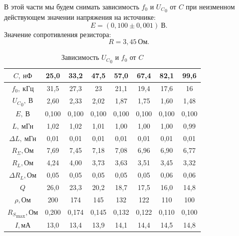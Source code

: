 \documentclass[12pt,a4paper]{article}
\begin{document}
В этой части мы будем снимать зависимость $f_0$ и ${U_C}_0$ от $C$ при неизменном действующем значении напряжения на источнике:
\begin{equation} 
E = (0,100\pm0,001)~\text{В}.
\end{equation}
Значение сопротивления резистора:
\begin{equation}
R = 3,45~\text{Ом}.
\end{equation}
\begin{table}[ht]\centering
\begin{tabular}{|*{8}{c|}}
\hline
$C, ~\text{нФ}$&25,0&33,2&47,5&57,0&67,4&82,1&99,6\\
\hline
$f_0, ~\text{кГц}$&31,5&27,3&23&21,1&19,4&17,6&16\\
\hline
${U_C}_0, ~\text{В}$&2,60&2,33&2,02&1,87&1,75&1,60&1,48\\
\hline
$E, ~\text{В}$&0,100&0,100&0,100&0,100&0,100&0,100&0,100\\
\hline
$L, ~\text{мГн}$&1,02&1,02&1,01&1,00&1,00&1,00&0,99\\
\hline
$\Delta L, ~\text{мГн}$&0,01&0,01&0,01&0,01&0,01&0,01&0,01\\
\hline
$R_{\Sigma}, \text{Ом}$&7,69&7,45&7,18&7,08&6,96&6,90&6,77\\
\hline
$R_L, \text{Ом}$&4,24&4,00&3,73&3,63&3,51&3,45&3,32\\
\hline
$\Delta R_L, \text{Ом}$&0,05&0,05&0,05&0,05&0,05&0,06&0,06\\
\hline
$Q$&26,0&23,3&20,2&18,7&17,5&16,0&14,8\\
\hline
$\rho, \text{Ом}$&200&174&145&132&122&110&100\\
\hline
${R_S}_\text{max}, \text{Ом}$&0,200&0,174&0,145&0,132&0,122&0,110&0,100\\
\hline
$I, \text{мА}$&13,0&13,4&13,9&14,1&14,4&14,5&14,8\\
\hline
\end{tabular}
\caption{Зависимость ${U_C}_0$ и $f_0$ от $C$}
\end{table}
\end{document}
